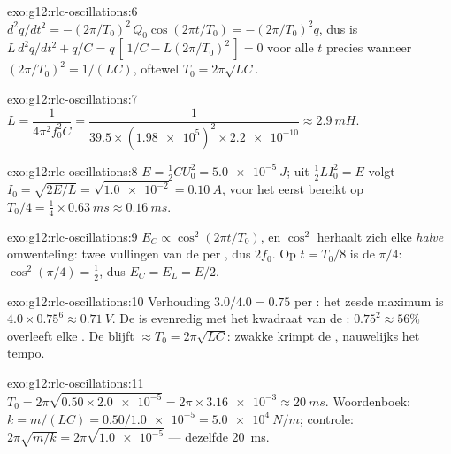 \begin{solution}{exo:g12:rlc-oscillations:6}
$d^2q/dt^2 = -(2\pi/T_0)^2\,Q_0\cos(2\pi t/T_0) = -(2\pi/T_0)^2 q$, dus is
$L\,d^2q/dt^2 + q/C = q\,[\,1/C - L(2\pi/T_0)^2\,] = 0$ voor alle $t$ precies
wanneer $(2\pi/T_0)^2 = 1/(LC)$, oftewel $T_0 = 2\pi\sqrt{LC}$.
\end{solution}

\begin{solution}{exo:g12:rlc-oscillations:7}
$L = \dfrac{1}{4\pi^2 f_0^2 C} = \dfrac{1}{39.5 \times
(\num{1.98e5})^2 \times \num{2.2e-10}} \approx \qty{2.9}{mH}$.
\end{solution}

\begin{solution}{exo:g12:rlc-oscillations:8}
$E = \tfrac12 CU_0^2 = \qty{5.0e-5}{J}$; uit $\tfrac12 LI_0^2 = E$ volgt
$I_0 = \sqrt{2E/L} = \sqrt{\num{1.0e-2}} = \qty{0.10}{A}$, voor het eerst
bereikt op $T_0/4 = \tfrac14 \times \qty{0.63}{ms} \approx \qty{0.16}{ms}$.
\end{solution}

\begin{solution}{exo:g12:rlc-oscillations:9}
$E_C \propto \cos^2(2\pi t/T_0)$, en $\cos^2$ herhaalt zich elke \emph{halve}
omwenteling: twee vullingen van de  per , dus $2f_0$. Op
$t = T_0/8$ is de  $\pi/4$: $\cos^2(\pi/4) = \tfrac12$, dus
$E_C = E_L = E/2$.
\end{solution}

\begin{solution}{exo:g12:rlc-oscillations:10}
Verhouding $3.0/4.0 = 0.75$ per : het zesde maximum is
$4.0 \times 0.75^6 \approx \qty{0.71}{V}$. De  is evenredig met het
kwadraat van de : $0.75^2 \approx 56\%$ overleeft elke . De
 blijft $\approx T_0 = 2\pi\sqrt{LC}$: zwakke  krimpt de
, nauwelijks het tempo.
\end{solution}

\begin{solution}{exo:g12:rlc-oscillations:11}
$T_0 = 2\pi\sqrt{0.50 \times \num{2.0e-5}} = 2\pi \times \num{3.16e-3}
\approx \qty{20}{ms}$. Woordenboek: $k = m/(LC) = 0.50/\num{1.0e-5} =
\qty{5.0e4}{N/m}$; controle: $2\pi\sqrt{m/k} = 2\pi\sqrt{\num{1.0e-5}}$ ---
dezelfde \qty{20}{ms}.
\end{solution}

